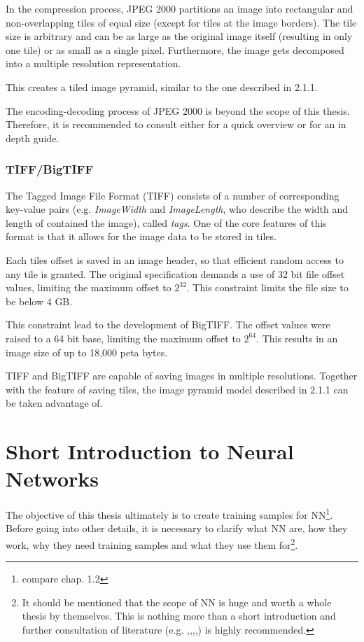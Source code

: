 In the compression process, JPEG 2000 partitions an image into rectangular and non-overlapping tiles of equal size (except for tiles at the image borders). The tile size is arbitrary and
can be as large as the original image itself (resulting in only one tile) or as small as a single pixel. Furthermore, the image gets decomposed into a multiple resolution representation\cite{Rabbani02}. 

This creates a tiled image pyramid, similar to the one described in 2.1.1.

The encoding-decoding process of JPEG 2000 is beyond the scope of this thesis. Therefore, it is recommended to consult either \cite{intoPix08} for a quick overview or \cite{Rabbani02} for an in depth guide.


\subsubsection{TIFF/BigTIFF}
The Tagged Image File Format (TIFF) consists of a number of corresponding key-value pairs (e.g. \emph{ImageWidth} and \emph{ImageLength}, who describe the width and length of contained the image), called \emph{tags}. One of the core features of this format is that it allows for the image data to be stored in tiles\cite{Eddins07}.

Each tiles offset is saved in an image header, so that efficient random access to any tile is granted. The original specification demands a use of 32 bit file offset values, limiting the maximum offset to $2^{32}$. This constraint limits the file size to be below 4 GB\cite{Eddins07}.

This constraint lead to the development of BigTIFF. The offset values were raised to a 64 bit base, limiting the maximum offset to $2^{64}$. This results in an image size of up to 18,000 peta bytes\cite{web:digitalpreservation}.

TIFF and BigTIFF are capable of saving images in multiple resolutions. Together with the feature of saving tiles, the image pyramid model described in 2.1.1 can be taken advantage of\cite{web:digitalpreservation2}.


\section{Short Introduction to Neural Networks}
The objective of this thesis ultimately is to create training samples for NN\footnote{compare chap. 1.2}. Before going into other details, it is necessary to clarify what NN are, how they work, why they need training samples and what they use them for\footnote{It should be mentioned that the scope of NN is huge and worth a whole thesis by themselves. This is nothing more than a short introduction and further consultation of literature (e.g. \cite{Stergiou96},\cite{Bourg04},\cite{Egmont-Petersen02},\cite{Kriesel07},\cite{Shiffman12}) is highly recommended.}.

